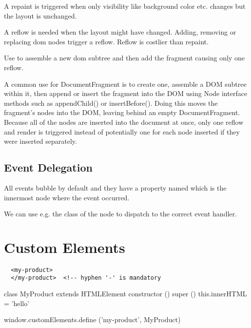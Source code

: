A repaint is triggered when only visibility like background color etc. changes
but the layout is unchanged.

A reflow is needed when the layout might have changed. Adding, removing or
replacing dom nodes trigger a reflow. Reflow is costlier than repaint.

Use  to assemble a new dom subtree and then add
the fragment causing only one reflow.


A common use for DocumentFragment is to create one, assemble a DOM subtree
within it, then append or insert the fragment into the DOM using Node
interface methods such as appendChild() or insertBefore(). Doing this moves
the fragment's nodes into the DOM, leaving behind an empty
DocumentFragment. Because all of the nodes are inserted into the document at
once, only one reflow and render is triggered instead of potentially one for
each node inserted if they were inserted separately.


\subsection{Event Delegation}

All events bubble by default and they have a property named 
which is the innermost node where the event occurred.

We can use e.g. the class  of the node to dispatch to the correct
event handler.



\section{Custom Elements}

{\small
\begin{verbatim}
  <my-product>
  </my-product>  <!-- hyphen '-' is mandatory
\end{verbatim}
}

\begin{js}
  class MyProduct extends HTMLElement {
    constructor () {
      super ()
      this.innerHTML = 'hello'
    }
  }

  window.customElements.define ('my-product', MyProduct)
\end{js}

